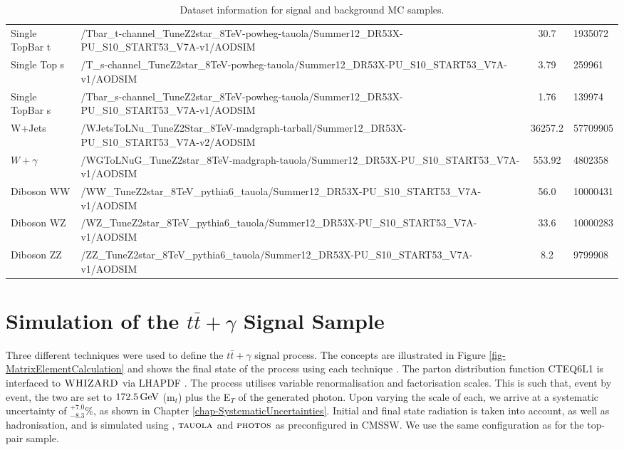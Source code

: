 \begin{table}
\begin{center}
{\begin{tabular}{|l| p{12.5cm} |c|p{2cm}|}
	Single TopBar t & /Tbar\_t-channel\_TuneZ2star\_8TeV-powheg-tauola/Summer12\_DR53X-PU\_S10\_START53\_V7A-v1/AODSIM & 30.7 & 1935072 \\
	Single Top s & /T\_s-channel\_TuneZ2star\_8TeV-powheg-tauola/Summer12\_DR53X-PU\_S10\_START53\_V7A-v1/AODSIM & 3.79 & 259961 \\
	Single TopBar s & /Tbar\_s-channel\_TuneZ2star\_8TeV-powheg-tauola/Summer12\_DR53X-PU\_S10\_START53\_V7A-v1/AODSIM  & 1.76 & 139974 \\
\hline	
	W+Jets & /WJetsToLNu\_TuneZ2Star\_8TeV-madgraph-tarball/Summer12\_DR53X-PU\_S10\_START53\_V7A-v2/AODSIM & 36257.2 & 57709905 \\
\hline	
	$W+\gamma$ & /WGToLNuG\_TuneZ2star\_8TeV-madgraph-tauola/Summer12\_DR53X-PU\_S10\_START53\_V7A-v1/AODSIM & 553.92 & 4802358 \\
\hline	
	Diboson WW & /WW\_TuneZ2star\_8TeV\_pythia6\_tauola/Summer12\_DR53X-PU\_S10\_START53\_V7A-v1/AODSIM & 56.0 & 10000431\\
	Diboson WZ & /WZ\_TuneZ2star\_8TeV\_pythia6\_tauola/Summer12\_DR53X-PU\_S10\_START53\_V7A-v1/AODSIM & 33.6 & 10000283\\
	Diboson ZZ & /ZZ\_TuneZ2star\_8TeV\_pythia6\_tauola/Summer12\_DR53X-PU\_S10\_START53\_V7A-v1/AODSIM & 8.2 & 9799908\\
\hline	
\end{tabular}
}
\caption{Dataset information for signal and background MC samples.}
\end{center}
\end{table}


\section{Simulation of the $t\bar{t}+\gamma$ Signal Sample} \label{sec-mcsim}

Three different techniques were used to define the $t\bar{t}+\gamma$ signal process. The concepts are illustrated in Figure \ref{fig-MatrixElementCalculation} and shows the final state of the process using each technique \cite{heinerthesis}. The parton distribution function CTEQ6L1 \cite{Pumplin:2002vw} is interfaced to ${\textsc{WHIZARD}}$ via LHAPDF \cite{Whalley:2005nh}. The process utilises variable renormalisation and factorisation scales. This is such that, event by event, the two are set to $172.5 \,\text{Ge\hspace{-.08em}V}$ (m$_t$) plus the E$_T$ of the generated photon. Upon varying the scale of each, we arrive at a systematic uncertainty of $^{+7.0}_{-8.3}\%$, as shown in Chapter \ref{chap-SystematicUncertainties}. Initial and final state radiation is taken into account, as well as hadronisation, and is simulated using  \cite{Sjostrand:2006za}, $\textsc{tauola}$ and $\textsc{photos}$ \cite{Was:2006my} as preconfigured in CMSSW. We use the same configuration as for the top-pair sample.

